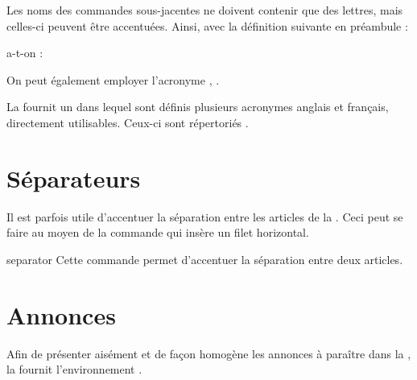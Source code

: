 \documentclass{letgut}
\begin{document}
Les noms des commandes sous-jacentes ne doivent contenir que des lettres, mais
celles-ci peuvent être accentuées. Ainsi, avec la définition suivante en
préambule :

\begin{ltx-code}[title addon=définition d'acronyme avec lettres
  accentuées,drop lifted shadow]
\end{ltx-code}

a-t-on :

\begin{ltx-code-result}[title addon=utilisation d'acronyme avec lettres accentuées,listing options app={deletekeywords={[3]{l}}}]
On peut également employer l'acronyme , .
\end{ltx-code-result}

La  fournit un  dans lequel sont définis
plusieurs acronymes anglais et français, directement utilisables. Ceux-ci sont
répertoriés .

\section{Séparateurs}
\label{sec:filets}

Il est parfois utile d'accentuer la séparation entre les articles de la
. Ceci peut se faire au moyen de la commande  qui
insère un filet horizontal.

\begin{docCommand}{separator}{}
  Cette commande permet d'accentuer la séparation entre deux articles.
\end{docCommand}

\section{Annonces}
\label{sec:annonces}

Afin de présenter aisément et de façon homogène les annonces à paraître dans la
, la  fournit l'environnement .
\end{document}
